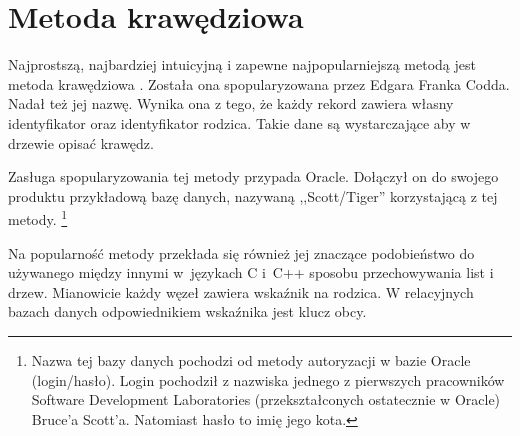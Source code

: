\section{Metoda krawędziowa}








Najprostszą, najbardziej intuicyjną i zapewne najpopularniejszą metodą jest metoda krawędziowa .
Została ona spopularyzowana przez Edgara Franka Codda. 
Nadał też jej nazwę. Wynika ona z tego, że każdy rekord zawiera własny identyfikator oraz identyfikator rodzica. Takie dane są wystarczające aby w drzewie opisać krawędz.


Zasługa spopularyzowania tej metody przypada Oracle.
Dołączył on do swojego produktu przykładową bazę danych, nazywaną ,,Scott/Tiger'' 
korzystającą z tej metody.
\footnote{
    Nazwa tej bazy danych pochodzi od metody autoryzacji w bazie Oracle (login/hasło).
    Login pochodził z nazwiska jednego z pierwszych pracowników 
    Software Development Laboratories (przekształconych ostatecznie w Oracle) Bruce'a Scott'a. 
    Natomiast hasło to imię jego kota.
}

Na popularność metody przekłada się również jej znaczące podobieństwo do 
używanego między innymi w~językach C i~C++ sposobu przechowywania list i drzew.
Mianowicie każdy węzeł zawiera wskaźnik na rodzica. 
W relacyjnych bazach danych odpowiednikiem wskaźnika jest klucz obcy. 


